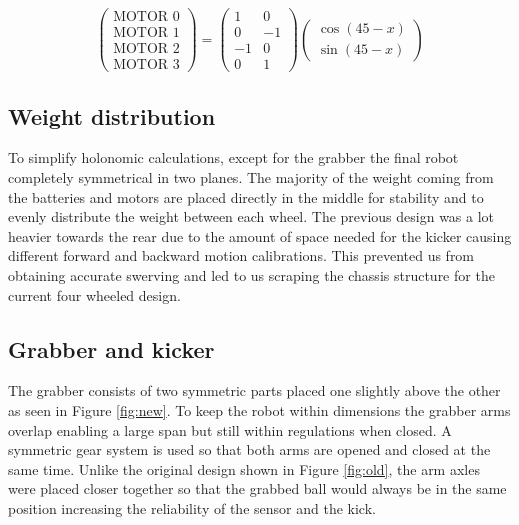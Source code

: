 \documentclass[a4paper,12pt]{article}
\begin{document}
$$\begin{pmatrix}
\text{MOTOR 0}\\ 
\text{MOTOR 1}\\ 
\text{MOTOR 2}\\ 
\text{MOTOR 3}
\end{pmatrix}=
\begin{pmatrix}
1 & 0\\ 
0 & -1\\ 
-1 & 0\\ 
0 & 1 
\end{pmatrix}
\begin{pmatrix}
\cos(45-x)\\ 
\sin(45-x)
\end{pmatrix}$$

\subsection{Weight distribution}

To simplify holonomic calculations, except for the grabber the final robot completely symmetrical in two planes. The majority of the weight coming from the batteries and motors are placed directly in the middle for stability and to evenly distribute the weight between each wheel. The previous design was a lot heavier towards the rear due to the amount of space needed for the kicker causing different forward and backward motion calibrations. This prevented us from obtaining accurate swerving and led to us scraping the chassis structure for the current four wheeled design. 

\subsection{Grabber and kicker}

The grabber consists of two symmetric parts placed one slightly above the other as seen in Figure \ref{fig:new}. To keep the robot within dimensions the grabber arms overlap enabling a large span but still within regulations when closed. A symmetric gear system is used so that both arms are opened and closed at the same time. Unlike the original design shown in Figure \ref{fig:old}, the arm axles were placed closer together so that the grabbed ball would always be in the same position increasing the reliability of the sensor and the kick.
\end{document}
